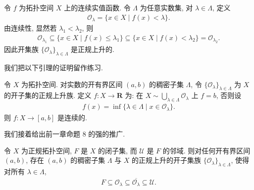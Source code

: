 \documentclass[../../main.tex]{subfiles}
\begin{document}
\begin{example}\label{example:ch12-正规上升例}
令 $f$ 为拓扑空间 $X$ 上的连续实值函数. 令 $\Lambda$ 为任意实数集, 对 $\lambda\in\Lambda$, 定义
\begin{align*}
\mathcal{O}_{\lambda}=\{x\in X\mid f(x)<\lambda\}.
\end{align*}
由连续性, 显然若 $\lambda_{1}<\lambda_{2}$, 则
\begin{align*}
\mathcal{O}_{\lambda_{1}}\subseteq\{x\in X\mid f(x)\leqslant\lambda_{1}\}\subseteq\{x\in X\mid f(x)<\lambda_{2}\}=\mathcal{O}_{\lambda_{2}}.
\end{align*}
因此开集族 $\{\mathcal{O}_{\lambda}\}_{\lambda\in\Lambda}$ 是正规上升的.
\end{example}

我们把以下引理的证明留作练习.

\begin{lemma}\label{lemma:ch12-正规上升连续}
令 $X$ 为拓扑空间. 对实数的开有界区间 $(a,b)$ 的稠密子集 $\Lambda$, 令 $\{\mathcal{O}_{\lambda}\}_{\lambda\in\Lambda}$ 为 $X$ 的开子集的正规上升族. 定义 $f:X\to\mathbf{R}$ 为: 在 $X\sim\bigcup_{\lambda\in\Lambda}\mathcal{O}_{\lambda}$ 上 $f=b$, 否则设
\begin{align}
f(x)=\inf\{\lambda\in\Lambda\mid x\in\mathcal{O}_{\lambda}\}.\label{align:ch12-正规上升f}
\end{align}
则 $f:X\to[a,b]$ 是连续的.
\end{lemma}

我们接着给出前一章命题 8 的强的推广.

\begin{lemma}\label{lemma:ch12-正规延拓}
令 $X$ 为正规拓扑空间, $F$ 是 $X$ 的闭子集, 而 $\mathcal{U}$ 是 $F$ 的邻域. 则对任何开有界区间 $(a,b)$, 存在 $(a,b)$ 的稠密子集 $\Lambda$ 与 $X$ 的正规上升的开子集族 $\{\mathcal{O}_{\lambda}\}_{\lambda\in\Lambda}$, 使得对所有 $\lambda\in\Lambda$,
\begin{align}
F\subseteq\mathcal{O}_{\lambda}\subseteq\overline{\mathcal{O}_{\lambda}}\subseteq\mathcal{U}.\label{align:ch12-正规延拓}
\end{align}
\end{lemma}
\end{document}
